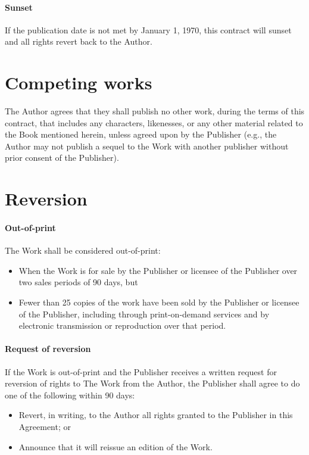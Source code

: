 \documentclass[12pt,letterpaper]{article}
\def\PublicationDate{January 1, 1970}
\begin{document}
\paragraph{Sunset}

If the publication date is not met by \PublicationDate, this contract will sunset and all rights revert back to the Author.

\section{Competing works}

The Author agrees that they shall publish no other work, during the terms of this contract, that includes any characters, likenesses, or any other material related to the Book mentioned herein, unless agreed upon by the Publisher (e.g., the Author may not publish a sequel to the Work with another publisher without prior consent of the Publisher).

\section{Reversion}

\paragraph{Out-of-print}

The Work shall be considered out-of-print:

\begin{itemize}
    \item When the Work is for sale by the Publisher or licensee of the Publisher over two sales periods of 90 days, but
    \item Fewer than 25 copies of the work have been sold by the Publisher or licensee of the Publisher, including through print-on-demand services and by electronic transmission or reproduction over that period.
\end{itemize}

\paragraph{Request of reversion}

If the Work is out-of-print and the Publisher receives a written request for reversion of rights to The Work from the Author, the Publisher shall agree to do one of the following within 90 days:

\begin{itemize}
    \item Revert, in writing, to the Author all rights granted to the Publisher in this Agreement; or
    \item Announce that it will reissue an edition of the Work.
\end{itemize}
\end{document}
